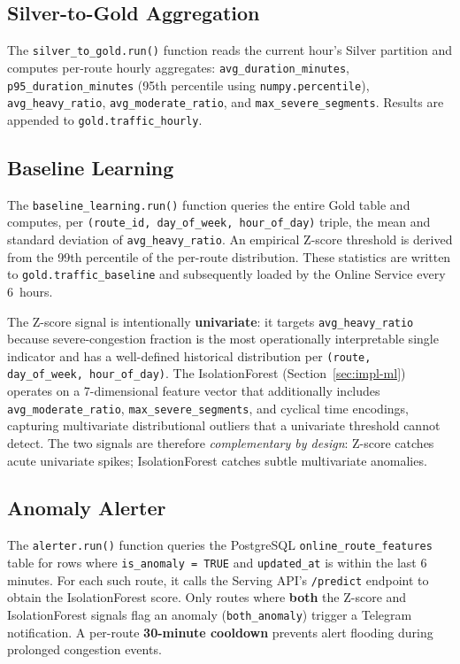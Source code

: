 \subsection{Silver-to-Gold Aggregation}

The \texttt{silver\_to\_gold.run()} function reads the current hour's Silver
partition and computes per-route hourly aggregates:
\texttt{avg\_duration\_minutes}, \texttt{p95\_duration\_minutes}
(95th percentile using \texttt{numpy.percentile}),
\texttt{avg\_heavy\_ratio}, \texttt{avg\_moderate\_ratio},
and \texttt{max\_severe\_segments}. Results are appended to
\texttt{gold.traffic\_hourly}.

\subsection{Baseline Learning}

The \texttt{baseline\_learning\allowbreak.run()} function queries the entire Gold table
and computes, per \texttt{(route\_id,\allowbreak\ day\_of\_week,\allowbreak\ hour\_of\_day)} triple,
the mean and standard deviation of \texttt{avg\_heavy\_ratio}. An empirical
Z-score threshold is derived from the 99th percentile of the per-route
distribution. These statistics are written to
\texttt{gold.traffic\_baseline} and subsequently loaded by the Online Service
every 6~hours.

\noindent The Z-score signal is intentionally \textbf{univariate}: it targets
\texttt{avg\_heavy\_ratio} because severe-congestion fraction is the most
operationally interpretable single indicator and has a well-defined
historical distribution per \texttt{(route, day\_of\_week, hour\_of\_day)}.
The IsolationForest (Section~\ref{sec:impl-ml}) operates on a
7-dimensional feature vector that additionally includes
\texttt{avg\_moderate\_ratio}, \texttt{max\_severe\_segments}, and cyclical
time encodings, capturing multivariate distributional outliers that a
univariate threshold cannot detect. The two signals are therefore
\textit{complementary by design}: Z-score catches acute univariate spikes;
IsolationForest catches subtle multivariate anomalies.

\subsection{Anomaly Alerter}

The \texttt{alerter.run()} function queries the PostgreSQL
\texttt{online\_route\_features} table for rows where \texttt{is\_anomaly = TRUE}
and \texttt{updated\_at} is within the last 6 minutes. For each such route,
it calls the Serving API's \texttt{/predict} endpoint to obtain the
IsolationForest score. Only routes where \textbf{both} the Z-score and
IsolationForest signals flag an anomaly (\texttt{both\_anomaly}) trigger a
Telegram notification. A per-route \textbf{30-minute cooldown} prevents
alert flooding during prolonged congestion events.

